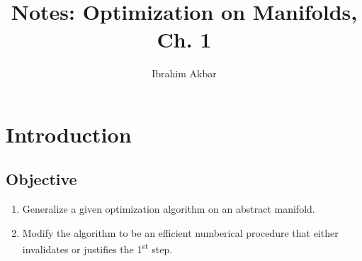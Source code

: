 \documentclass[a4paper]{article}
\begin{document}
\title{Notes: Optimization on Manifolds, Ch. 1}
\author{Ibrahim Akbar}
\maketitle

\section{Introduction}

\subsection{Objective}
\begin{enumerate}
     \item Generalize a given optimization algorithm on an abstract manifold.
     \item Modify the algorithm to be an efficient numberical procedure that either invalidates or justifies the 1\textsuperscript{st} step.
\end{enumerate}

\end{document}
